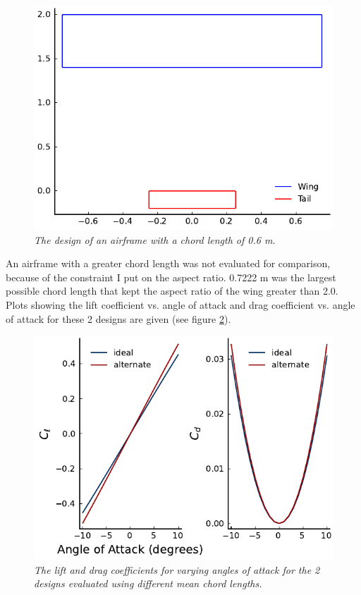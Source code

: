 \documentclass{journal}
\begin{document}
	\begin{figure}[H]
		\includegraphics{../graphics/chord_design.pdf}
		\caption{\emph{The design of an airframe with a chord length of 0.6 m.}}
		\label{fig:chord_design}
	\end{figure}
	
	An airframe with a greater chord length was not evaluated for comparison, because of the constraint I put on the aspect ratio. 0.7222 m was the largest possible chord length that kept the aspect ratio of the wing greater than 2.0.\\
	
	Plots showing the lift coefficient vs. angle of attack and drag coefficient vs. angle of attack for these 2 designs are given (see figure \ref{fig:chord_coeff}).
	
	\begin{figure}[H]
		\includegraphics{../graphics/chord_coeff.pdf}
		\caption{\emph{The lift and drag coefficients for varying angles of attack for the 2 designs evaluated using different mean chord lengths.}}
		\label{fig:chord_coeff}
	\end{figure}
	
\end{document}
